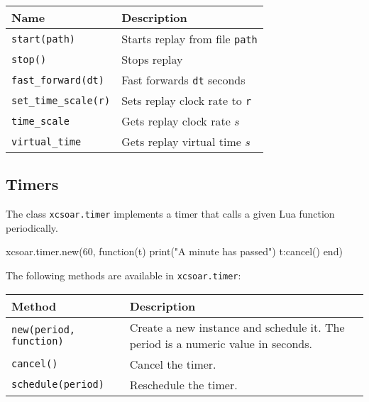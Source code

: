 \begin{maxipage}
\begin{tabularx}{1.9\textwidth}{l|X}
Name & Description \\
\hline\hline

\verb|start(path)| & Starts replay from file \verb|path|\\

\hline

\verb|stop()| & Stops replay\\

\hline

\verb|fast_forward(dt)| & Fast forwards \verb|dt| seconds\\

\hline

\verb|set_time_scale(r)| & Sets replay clock rate to \verb|r|\\

\hline

\verb|time_scale| & Gets replay clock rate $s$\\

\hline

\verb|virtual_time| & Gets replay virtual time $s$\\

\end{tabularx}
\end{maxipage}

\subsection{Timers}\label{sec:lua.timer}

The class \verb|xcsoar.timer| implements a timer that calls a given
Lua function periodically.

\begin{lua}
xcsoar.timer.new(60, function(t)
  print("A minute has passed")
  t:cancel()
end)
\end{lua}

The following methods are available in \verb|xcsoar.timer|:

\begin{maxipage}
\begin{tabularx}{1.9\textwidth}{l|X}
Method & Description \\
\hline\hline

\verb|new(period, function)| & Create a new instance and schedule
it.  The period is a numeric value in seconds. \\

\hline

\verb|cancel()| & Cancel the timer. \\

\hline

\verb|schedule(period)| & Reschedule the timer. \\

\end{tabularx}
\end{maxipage}

